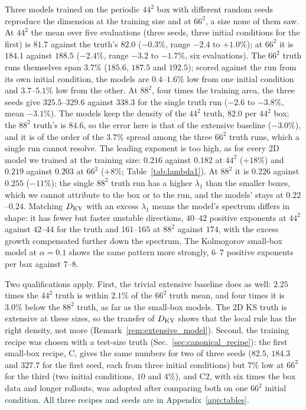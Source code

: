 Three models trained on the periodic $44^2$ box with different random
seeds reproduce the dimension at the training size and at $66^2$, a size
none of them saw. At $44^2$ the mean over five evaluations (three seeds,
three initial conditions for the first) is $81.7$ against the truth's
$82.0$ ($-0.3\%$, range $-2.4$ to $+1.0\%$); at $66^2$ it is $184.1$ against
$188.5$ ($-2.4\%$, range $-3.2$ to $-1.7\%$, six evaluations). The $66^2$
truth runs themselves span $3.7\%$ ($185.6$, $187.5$ and $192.5$); scored against
the run from its own initial condition, the models are $0.4$--$1.6\%$ low
from one initial condition and $3.7$--$5.1\%$ low from the other. At $88^2$, four
times the training area, the three seeds give $325.5$--$329.6$ against
$338.3$ for the single truth run ($-2.6$ to $-3.8\%$, mean $-3.1\%$). The models
keep the density of the $44^2$ truth, $82.0$ per $44^2$ box; the $88^2$
truth's is $84.6$, so the error here is that of the extensive baseline
($-3.0\%$), and it is of the order of the $3.7\%$ spread among the three $66^2$
truth runs, which a single run cannot resolve. The leading exponent is too high, as for every 2D model we
trained at the training size: $0.216$ against $0.182$ at $44^2$ ($+18\%$) and
$0.219$ against $0.203$ at $66^2$ ($+8\%$; Table~\ref{tab:lambda1}). At $88^2$
it is $0.226$ against $0.255$ ($-11\%$); the single $88^2$ truth run has a higher
$\lambda_1$ than the smaller boxes, which we cannot attribute to the box
or to the run, and the models' stays at $0.22$--$0.24$. Matching $D_{\mathrm{KY}}$
with an excess $\lambda_1$ means the model's spectrum differs in shape: it
has fewer but faster unstable directions, $40$--$42$ positive exponents at
$44^2$ against $42$--$44$ for the truth and $161$--$165$ at $88^2$ against
$174$, with the excess growth compensated
further down the spectrum. The Kolmogorov small-box model at $\alpha=0.1$
shows the same pattern more strongly, $6$--$7$ positive exponents per box
against $7$--$8$.

Two qualifications apply. First, the trivial extensive baseline does as
well: $2.25$ times the $44^2$ truth is within $2.1\%$ of the $66^2$ truth
mean, and four times it is $3.0\%$ below the $88^2$ truth, as far as the
small-box models. The 2D KS truth is extensive at these sizes, so the transfer of
$D_{\mathrm{KY}}$ shows that the local rule has the right density, not more
(Remark~\ref{rem:extensive_model}). Second, the training recipe was chosen
with a test-size truth (Sec.~\ref{sec:canonical_recipe}): the first
small-box recipe, C, gives the same numbers for two of three seeds
($82.5$, $184.3$ and $327.7$ for the first seed, each from three initial
conditions) but $7\%$ low at $66^2$ for the third (two initial conditions, $10$ and $4\%$), and C2, with six times
the box data and longer rollouts, was adopted after comparing both on one
$66^2$ initial condition. All three recipes and seeds are in
Appendix~\ref{app:tables}.

